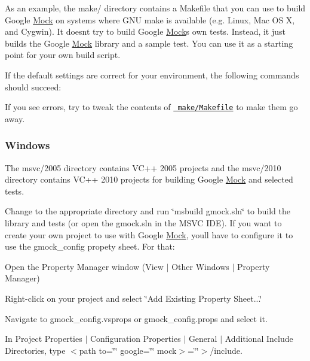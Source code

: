 As an example, the make/ directory contains a Makefile that you can use to build Google \mbox{\hyperlink{class_mock}{Mock}} on systems where G\+NU make is available (e.\+g. Linux, Mac OS X, and Cygwin). It doesn\textquotesingle{}t try to build Google \mbox{\hyperlink{class_mock}{Mock}}\textquotesingle{}s own tests. Instead, it just builds the Google \mbox{\hyperlink{class_mock}{Mock}} library and a sample test. You can use it as a starting point for your own build script.

If the default settings are correct for your environment, the following commands should succeed\+: 


If you see errors, try to tweak the contents of \href{make/Makefile}\texttt{ make/\+Makefile} to make them go away.

\subsubsection*{Windows}

The msvc/2005 directory contains V\+C++ 2005 projects and the msvc/2010 directory contains V\+C++ 2010 projects for building Google \mbox{\hyperlink{class_mock}{Mock}} and selected tests.

Change to the appropriate directory and run \char`\"{}msbuild gmock.\+sln\char`\"{} to build the library and tests (or open the gmock.\+sln in the M\+S\+VC I\+DE). If you want to create your own project to use with Google \mbox{\hyperlink{class_mock}{Mock}}, you\textquotesingle{}ll have to configure it to use the {\ttfamily gmock\+\_\+config} propety sheet. For that\+:


\begin{DoxyItemize}
\item Open the Property Manager window (View $\vert$ Other Windows $\vert$ Property Manager)
\item Right-\/click on your project and select \char`\"{}\+Add Existing Property Sheet...\char`\"{}
\item Navigate to {\ttfamily gmock\+\_\+config.\+vsprops} or {\ttfamily gmock\+\_\+config.\+props} and select it.
\item In Project Properties $\vert$ Configuration Properties $\vert$ General $\vert$ Additional Include Directories, type $<$path to=\char`\"{}\char`\"{} google=\char`\"{}\char`\"{} mock$>$=\char`\"{}\char`\"{}$>$/include.
\end{DoxyItemize}

